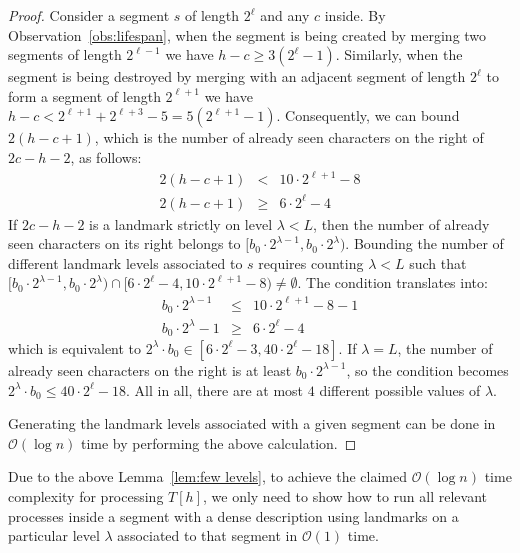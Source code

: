 \documentclass{article}[11pt,letter]
\newcommand{\bigo}{\mathcal{O}}
\newcommand{\level}{\lambda}
\begin{document}
\begin{proof}
Consider a segment $s$ of length $2^{\ell}$ and any $c$ inside. By Observation~\ref{obs:lifespan}, when the segment is being created
by merging two segments of length $2^{\ell-1}$ we have $h-c \geq  3(2^{\ell}-1)$. Similarly, when the segment is being destroyed
by merging with an adjacent segment of length $2^{\ell}$ to form a segment of length $2^{\ell+1}$ we have $h-c < 2^{\ell+1}+2^{\ell+3}-5=
5(2^{\ell+1}-1)$. Consequently, we can bound $2(h-c+1)$, which is the number of already seen characters on the right of $2c-h-2$, as follows:
\begin{eqnarray*}
2(h-c+1) &<& 10\cdot 2^{\ell+1}-8 \\
2(h-c+1) &\geq&  6\cdot 2^{\ell}-4
\end{eqnarray*}
If $2c-h-2$ is a landmark strictly on level $\level<L$, then the number of already seen characters on its right belongs to
$[b_{0}\cdot 2^{\level-1},b_{0}\cdot 2^{\level})$. Bounding the number of different
landmark levels associated to $s$ requires counting $\level<L$ such that 
$[b_{0}\cdot 2^{\level-1},b_{0}\cdot 2^{\level}) \cap [6\cdot 2^{\ell}-4,10\cdot 2^{\ell+1}-8) \neq \emptyset$.
The condition translates into:
\begin{eqnarray*}
b_{0} \cdot 2^{\level-1} &\leq& 10\cdot 2^{\ell+1} - 8 - 1 \\
b_{0} \cdot 2^{\level}-1 &\geq& 6\cdot 2^{\ell}-4
\end{eqnarray*}
which is equivalent to $2^{\level}\cdot b_{0} \in [6\cdot 2^{\ell}-3,40\cdot 2^{\ell}-18]$. If $\level=L$, the number of already seen characters on
the right is at least $b_{0}\cdot 2^{\level-1}$, so the condition becomes $2^{\level}\cdot b_{0}\leq 40\cdot 2^{\ell}-18$.
All in all, there are at most $4$ different possible values of $\level$.

Generating the landmark levels associated with a given segment can be done in $\bigo(\log n)$ time by performing the above calculation.
\end{proof}

Due to the above Lemma~\ref{lem:few levels}, to achieve the claimed $\bigo(\log n)$ time complexity for processing $T[h]$,
we only need to show how to run all relevant processes inside a segment with a dense description using landmarks on a particular level
$\level$ associated to that segment in $\bigo(1)$ time.
\end{document}
